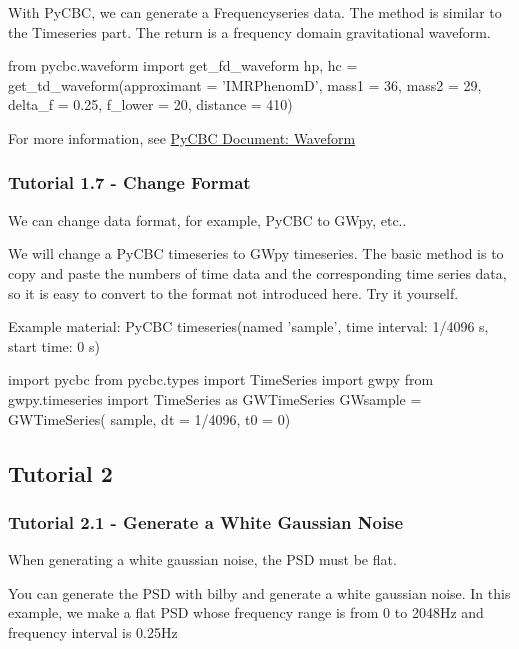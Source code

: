 With PyCBC, we can generate a Frequencyseries data. The method is similar to the Timeseries part. The return is a frequency domain gravitational waveform.

\begin{python}[python3]
    from pycbc.waveform import get_fd_waveform
    hp, hc = get_td_waveform(approximant = 'IMRPhenomD',
                             mass1 = 36,
                             mass2 = 29,
                             delta_f = 0.25,
                             f_lower = 20,
                             distance = 410)
\end{python}

For more information, see \href{https://pycbc.org/pycbc/latest/html/pycbc.waveform.html#pycbc.waveform.waveform.get_td_waveform}{PyCBC Document: Waveform}

\subsubsection{Tutorial 1.7 - Change Format}

We can change data format, for example, PyCBC to GWpy, etc..

We will change a PyCBC timeseries to GWpy timeseries. The basic method is to copy and paste the numbers of time data and the corresponding time series data, so it is easy to convert to the format not introduced here. Try it yourself.

Example material: PyCBC timeseries(named 'sample', time interval: 1/4096 s, start time: 0 s)

\begin{python}[python3]
    import pycbc
    from pycbc.types import TimeSeries
    import gwpy
    from gwpy.timeseries import TimeSeries as GWTimeSeries
    GWsample = GWTimeSeries(
    sample,
    dt = 1/4096,
    t0 = 0)
\end{python}

\subsection{Tutorial 2}

\subsubsection{Tutorial 2.1 - Generate a White Gaussian Noise}

When generating a white gaussian noise, the PSD must be flat.

You can generate the PSD with bilby and generate a white gaussian noise. In this example, we make a flat PSD whose frequency range is from 0 to 2048Hz and frequency interval is 0.25Hz

